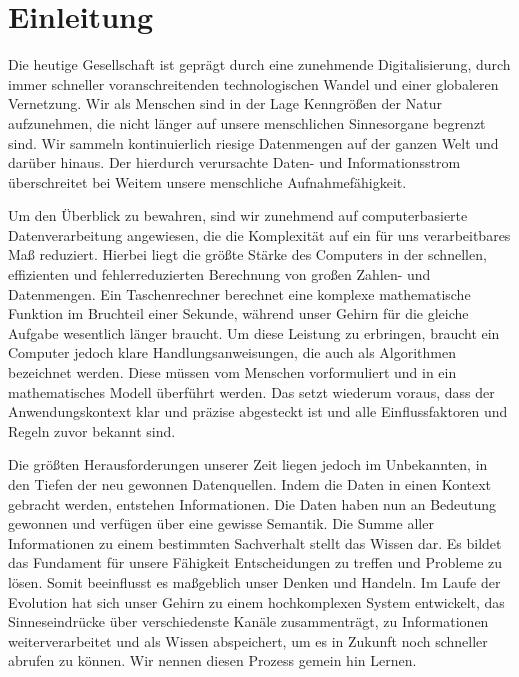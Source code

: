 

\section{Einleitung}



Die heutige Gesellschaft ist geprägt durch eine zunehmende Digitalisierung, durch immer schneller voranschreitenden technologischen Wandel und einer globaleren Vernetzung. Wir als Menschen sind in der Lage Kenngrößen der Natur aufzunehmen, die nicht länger auf unsere menschlichen Sinnesorgane begrenzt sind. Wir sammeln kontinuierlich riesige Datenmengen auf der ganzen Welt und darüber hinaus. Der hierdurch verursachte Daten- und Informationsstrom überschreitet bei Weitem unsere menschliche Aufnahmefähigkeit.\par\medskip

Um den Überblick zu bewahren, sind wir zunehmend auf computerbasierte Datenverarbeitung angewiesen, die die Komplexität auf ein für uns verarbeitbares Maß reduziert. Hierbei liegt die größte Stärke des Computers in der schnellen, effizienten und fehlerreduzierten Berechnung von großen Zahlen- und Datenmengen. Ein Taschenrechner berechnet eine komplexe mathematische Funktion im Bruchteil einer Sekunde, während unser Gehirn für die gleiche Aufgabe wesentlich länger braucht. Um diese Leistung zu erbringen, braucht ein Computer jedoch klare Handlungsanweisungen, die auch als Algorithmen bezeichnet werden. Diese müssen vom Menschen vorformuliert und in ein mathematisches Modell überführt werden. Das setzt wiederum voraus, dass der Anwendungskontext klar und präzise abgesteckt ist und alle Einflussfaktoren und Regeln zuvor bekannt sind.\par\medskip

Die größten Herausforderungen unserer Zeit liegen jedoch im Unbekannten, in den Tiefen der neu gewonnen Datenquellen. Indem die Daten in einen Kontext gebracht werden, entstehen Informationen. Die Daten haben nun an Bedeutung gewonnen und verfügen über eine gewisse Semantik. Die Summe aller Informationen zu einem bestimmten Sachverhalt stellt das Wissen dar. Es bildet das Fundament für unsere Fähigkeit Entscheidungen zu treffen und Probleme zu lösen. Somit beeinflusst es maßgeblich unser Denken und Handeln. Im Laufe der Evolution hat sich unser Gehirn zu einem hochkomplexen System entwickelt, das Sinneseindrücke über verschiedenste Kanäle zusammenträgt, zu Informationen weiterverarbeitet und als Wissen abspeichert, um es in Zukunft noch schneller abrufen zu können. Wir nennen diesen Prozess gemein hin Lernen.\par\medskip

